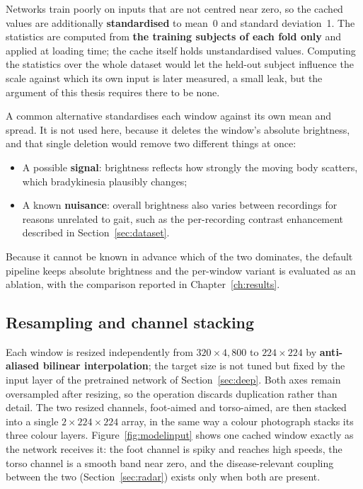 Networks train poorly on inputs that are not centred near zero, so the
cached values are additionally \textbf{standardised} to mean~0 and standard
deviation~1. The statistics are computed from \textbf{the training
subjects of each fold only} and applied at loading time; the cache itself
holds unstandardised values. Computing the statistics over the whole dataset
would let the held-out subject influence the scale against which its own input
is later measured, a small leak, but the argument of this thesis requires
there to be none.

A common alternative standardises each window against its own mean and
spread. It is not used here, because it deletes the window's absolute
brightness, and that single deletion would remove two different things at
once:

\begin{itemize}
  \item A possible \textbf{signal}: brightness reflects how strongly the
        moving body scatters, which bradykinesia plausibly changes;
  \item A known \textbf{nuisance}: overall brightness also varies between
        recordings for reasons unrelated to gait, such as the per-recording
        contrast enhancement described in Section~\ref{sec:dataset}.
\end{itemize}

Because it cannot be known in advance which of the two dominates, the default
pipeline keeps absolute brightness and the per-window variant is evaluated as
an ablation, with the comparison reported in Chapter~\ref{ch:results}.

\subsection{Resampling and channel stacking}

Each window is resized independently from $320 \times 4{,}800$ to
$224 \times 224$ by \textbf{anti-aliased bilinear interpolation}; the target
size is not tuned but fixed by the input layer of the pretrained network of
Section~\ref{sec:deep}. Both axes remain oversampled after resizing, so the
operation discards duplication rather than detail. The two resized channels,
foot-aimed and torso-aimed, are then stacked into a single
$2 \times 224 \times 224$ array, in the same way a colour photograph stacks
its three colour layers. Figure~\ref{fig:modelinput} shows one cached window
exactly as the network receives it: the foot channel is spiky and reaches
high speeds, the torso channel is a smooth band near zero, and the
disease-relevant coupling between the two
(Section~\ref{sec:radar}) exists only when both are present.

